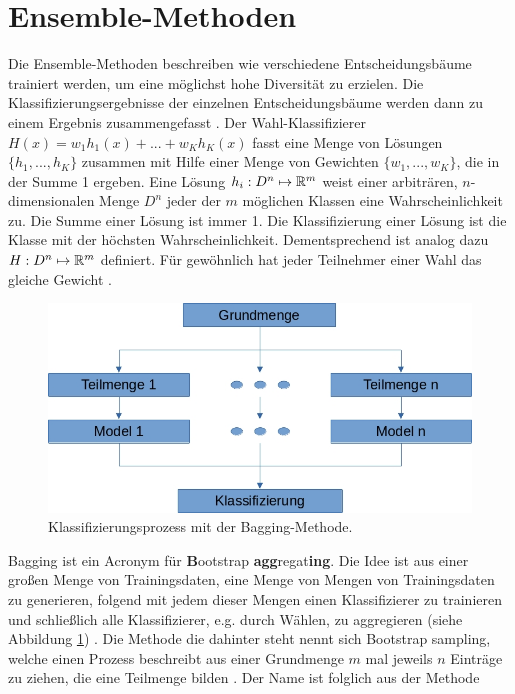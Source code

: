 \section{Ensemble-Methoden}
\label{sec:Ensemble}
\label{sec:wahlklassifizierer}
Die Ensemble-Methoden beschreiben wie verschiedene Entscheidungsbäume trainiert werden, um eine möglichst hohe Diversität zu erzielen. Die Klassifizierungsergebnisse der einzelnen Entscheidungsbäume werden
dann zu einem Ergebnis zusammengefasst \cite{dietterich2002ensemble}.
\newline
\newline
Der \glqq Wahl\grqq-Klassifizierer $H(x) = w_1 h_1(x) + ... + w_K h_K(x)$ fasst eine Menge von Lösungen $\{h_1, ..., h_K\}$ zusammen mit Hilfe einer Menge von Gewichten $\{w_1, ..., w_K\}$, die in der Summe 1
ergeben. Eine Lösung $h_i: D^n \mapsto {\mathbb R}^m$ weist einer arbiträren, $n$-dimensionalen Menge $D^n$ jeder der $m$ möglichen Klassen eine Wahrscheinlichkeit zu.
Die Summe einer Lösung ist immer 1. Die Klassifizierung einer Lösung ist die Klasse mit der höchsten Wahrscheinlichkeit. Dementsprechend ist analog dazu $H: D^n \mapsto {\mathbb R}^m$ definiert.
Für gewöhnlich hat jeder Teilnehmer einer Wahl das gleiche Gewicht \cite{dietterich2002ensemble}.
\newline
\newline
\begin{figure}
    \centering
    \includegraphics[width=0.6\linewidth]{images/bagging.jpg}
    \caption{Klassifizierungsprozess mit der Bagging-Methode.}
    \label{fig:bagging}
\end{figure}
Bagging ist ein Acronym für \glqq \textbf{B}ootstrap \textbf{agg}regat\textbf{ing}\grqq. Die Idee ist aus einer großen Menge von Trainingsdaten, eine Menge von Mengen von Trainingsdaten zu generieren, folgend mit jedem
dieser Mengen einen Klassifizierer zu trainieren und schließlich alle Klassifizierer, e.g. durch Wählen, zu aggregieren (siehe Abbildung \ref{fig:bagging}) \cite{breiman1996bagging}. Die Methode die dahinter steht nennt
sich \glqq Bootstrap sampling\grqq, welche einen Prozess beschreibt aus einer Grundmenge $m$ mal jeweils $n$ Einträge zu ziehen, die eine Teilmenge bilden \cite{efron1992bootstrap}. Der Name ist folglich aus der Methode

